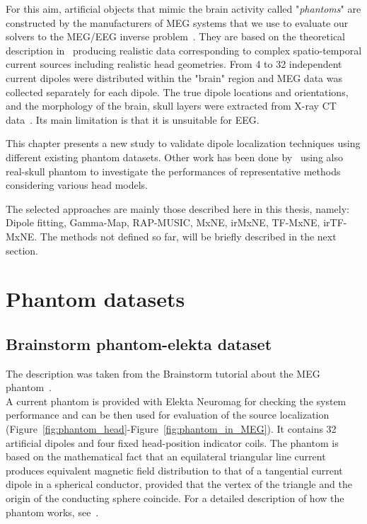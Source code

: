 For this aim, artificial objects that mimic the brain activity called "\textit{phantoms}" are constructed by the manufacturers of MEG systems that we use to evaluate our solvers to the MEG/EEG inverse problem~\cite{hazim2015magnetoencephalography}. They are based on the theoretical description in~\cite{ilmoniemi1985forward} producing realistic data corresponding to complex spatio-temporal current sources including realistic head geometries. From 4 to 32 independent current dipoles were distributed within the "brain" region and MEG data was collected separately for each dipole. The true dipole locations and orientations, and the morphology of the brain, skull layers were extracted from X-ray CT data~\cite{leahy1998study}. Its main limitation is that it is unsuitable for EEG.

This chapter presents a new study to validate dipole localization techniques using different existing phantom datasets. Other work has been done by~\cite{hazim2015magnetoencephalography,leahy1998study,baillet2001evaluation} using also real-skull phantom to investigate the performances of representative methods considering various head models.

The selected approaches are mainly those described here in this thesis, namely: Dipole fitting, Gamma-Map, RAP-MUSIC, MxNE, irMxNE, TF-MxNE, irTF-MxNE. The methods not defined so far, will be briefly described in the next section.

\section{Phantom datasets}
\subsection{Brainstorm phantom-elekta dataset}
The description was taken from the Brainstorm tutorial about the MEG phantom~\cite{tadel2011brainstorm}.\\

A current phantom is provided with Elekta Neuromag for checking the system performance and can be then used for evaluation of the source localization (Figure~\ref{fig:phantom_head}-Figure~\ref{fig:phantom_in_MEG}). It contains 32 artificial dipoles and four fixed head-position indicator coils. The phantom is based on the mathematical fact that an equilateral triangular line current produces equivalent magnetic field distribution to that of a tangential current dipole in a spherical conductor, provided that the vertex of the triangle and the origin of the conducting sphere coincide. For a detailed description of how the phantom works, see~\cite{ilmoniemi1985forward}.\\
\\

